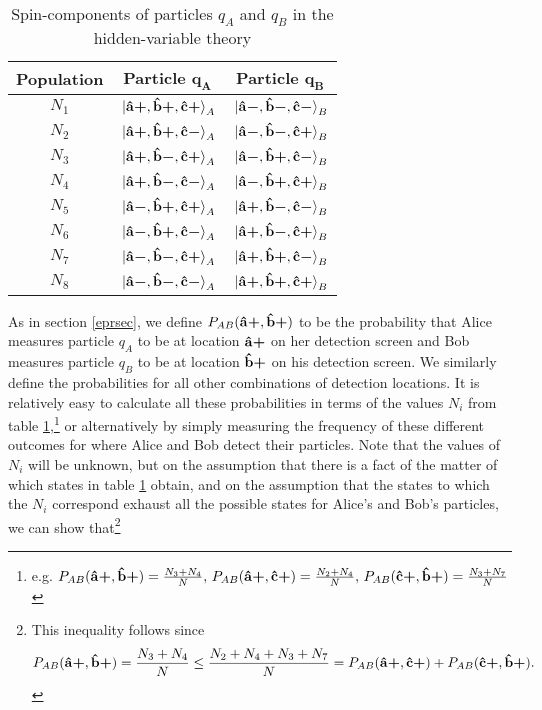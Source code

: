       \begin{table}[ht]
      \caption{Spin-components of particles $q_A$ and $q_B$ in the hidden-variable theory}
      \centering
      \begin{tabular}{c c c} 
      \\ 
      \hline
      \textbf{Population}& \textbf{Particle} $\bm{q_A}$ & \textbf{Particle} $\bm{q_B}$ \\ [0.5ex] 
      \hline
      $N_1$ & $\ket*{\vb{\hat{{a}}}\bm{+},\vb{\hat{{b}}}\bm{+},\vb{\hat{{c}}}\bm{+}}_A$ & $\ket*{\vb{\hat{{a}}}\bm{-},\vb{\hat{{b}}}\bm{-},\vb{\hat{{c}}}\bm{-}}_B$ \\ 
      
      $N_2$ & $\ket*{\vb{\hat{{a}}}\bm{+},\vb{\hat{{b}}}\bm{+},\vb{\hat{{c}}}\bm{-}}_A$ & $\ket*{\vb{\hat{{a}}}\bm{-},\vb{\hat{{b}}}\bm{-},\vb{\hat{{c}}}\bm{+}}_B $\\ 
      
      $N_3$ & $\ket*{\vb{\hat{{a}}}\bm{+},\vb{\hat{{b}}}\bm{-},\vb{\hat{{c}}}\bm{+}}_A$ & $\ket*{\vb{\hat{{a}}}\bm{-},\vb{\hat{{b}}}\bm{+},\vb{\hat{{c}}}\bm{-}}_B$ \\ 
      
      $N_4$ & $\ket*{\vb{\hat{{a}}}\bm{+},\vb{\hat{{b}}}\bm{-},\vb{\hat{{c}}}\bm{-}}_A$ & $\ket*{\vb{\hat{{a}}}\bm{-},\vb{\hat{{b}}}\bm{+},\vb{\hat{{c}}}\bm{+}}_B $\\ 
      
      $N_5$ & $\ket*{\vb{\hat{{a}}}\bm{-},\vb{\hat{{b}}}\bm{+},\vb{\hat{{c}}}\bm{+}}_A$ & $\ket*{\vb{\hat{{a}}}\bm{+},\vb{\hat{{b}}}\bm{-},\vb{\hat{{c}}}\bm{-}}_B$ \\ 
      
      $N_6$ & $\ket*{\vb{\hat{{a}}}\bm{-},\vb{\hat{{b}}}\bm{+},\vb{\hat{{c}}}\bm{-}}_A$ & $\ket*{\vb{\hat{{a}}}\bm{+},\vb{\hat{{b}}}\bm{-},\vb{\hat{{c}}}\bm{+}}_B$ \\ 
      
      $N_7$ & $\ket*{\vb{\hat{{a}}}\bm{-},\vb{\hat{{b}}}\bm{-},\vb{\hat{{c}}}\bm{+}}_A$ & $\ket*{\vb{\hat{{a}}}\bm{+},\vb{\hat{{b}}}\bm{+},\vb{\hat{{c}}}\bm{-} }_B$\\ 
      
      $N_8$ & $\ket*{\vb{\hat{{a}}}\bm{-},\vb{\hat{{b}}}\bm{-},\vb{\hat{{c}}}\bm{-}}_A$ & $\ket*{\vb{\hat{{a}}}\bm{+},\vb{\hat{{b}}}\bm{+},\vb{\hat{{c}}}\bm{+}}_B$ \\ 
      \hline
      \end{tabular}
      \label{hiddentable}
      \end{table}
As in section \ref{eprsec}, we define $P_{AB}(\vb{\hat{{a}}}\bm{+},\vb{\hat{{b}}}\bm{+})$ to be the probability that Alice measures particle $q_A$ to be at location $\vb{\hat{{a}}}\bm{+}$ on her detection screen and Bob measures particle $q_B$ to be at location $\vb{\hat{{b}}}\bm{+}$ on his detection screen. We similarly define the probabilities for all other combinations of detection locations. It is relatively easy to calculate all these probabilities in terms of the values $N_i$ from table \ref{hiddentable},\footnote{e.g.  $P_{AB}(\vb{\hat{{a}}}\bm{+},\vb{\hat{{b}}}\bm{+})=\frac{N_3+N_4}{N},\, P_{AB}(\vb{\hat{{a}}}\bm{+},\vb{\hat{{c}}}\bm{+})=\frac{N_2+N_4}{N},\,P_{AB}(\vb{\hat{{c}}}\bm{+},\vb{\hat{{b}}}\bm{+})=\frac{N_3+N_7}{N}$  } or alternatively by simply measuring the frequency of these different outcomes for where Alice and Bob detect their particles. Note that the values of $N_i$ will be unknown, but on the assumption that there is a fact of the matter of which states in table \ref{hiddentable} obtain, and on the assumption that the states to which the $N_i$ correspond exhaust all the possible states for Alice's and Bob's particles, we can show that\footnote{This inequality follows since 
$$P_{AB}(\vb{\hat{{a}}}\bm{+},\vb{\hat{{b}}}\bm{+})=\frac{N_3+N_4}{N}\leq \frac{N_2+N_4+N_3+N_7}{N}=P_{AB}(\vb{\hat{{a}}}\bm{+},\vb{\hat{{c}}}\bm{+})+P_{AB}(\vb{\hat{{c}}}\bm{+},\vb{\hat{{b}}}\bm{+}).$$}
